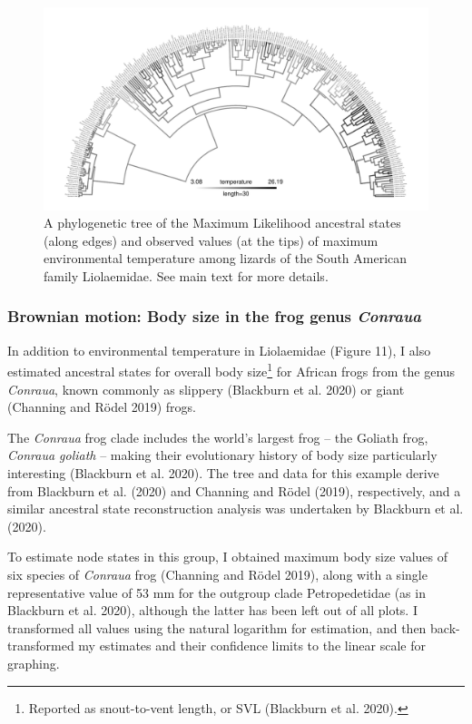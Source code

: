 \documentclass{article}
\begin{document}
\begin{figure}
\includegraphics[width=1\linewidth]{Revell.AncestralReconstruction_files/figure-latex/fig11-1} \caption{A phylogenetic tree of the Maximum Likelihood ancestral states (along edges) and observed values (at the tips) of maximum environmental temperature among lizards of the South American family Liolaemidae. See main text for more details.}\label{fig:fig11}
\end{figure}

\subsubsection{\texorpdfstring{Brownian motion: Body size in the frog genus \emph{Conraua}}{Brownian motion: Body size in the frog genus Conraua}}\label{brownian-motion-body-size-in-the-frog-genus-conraua}

In addition to environmental temperature in Liolaemidae (Figure 11), I also estimated ancestral states for overall body size\footnote{Reported as snout-to-vent length, or SVL (Blackburn et al. 2020).} for African frogs from the genus \emph{Conraua}, known commonly as slippery (Blackburn et al. 2020) or giant (Channing and Rödel 2019) frogs.

The \emph{Conraua} frog clade includes the world's largest frog -- the Goliath frog, \emph{Conraua goliath} -- making their evolutionary history of body size particularly interesting (Blackburn et al. 2020). The tree and data for this example derive from Blackburn et al. (2020) and Channing and Rödel (2019), respectively, and a similar ancestral state reconstruction analysis was undertaken by Blackburn et al. (2020).

To estimate node states in this group, I obtained maximum body size values of six species of \emph{Conraua} frog (Channing and Rödel 2019), along with a single representative value of 53 mm for the outgroup clade Petropedetidae (as in Blackburn et al. 2020), although the latter has been left out of all plots. I transformed all values using the natural logarithm for estimation, and then back-transformed my estimates and their confidence limits to the linear scale for graphing.
\end{document}
